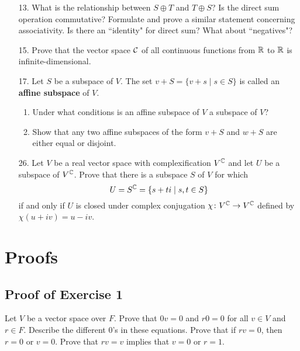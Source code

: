 \begin{enumerate}
\item[13.] What is the relationship between $S\oplus T$ and $T\oplus S$? Is the direct sum operation commutative? Formulate and prove a similar statement concerning associativity. Is there an ``identity" for direct sum? What about ``negatives"?

\item[15.] Prove that the vector space ${\mathcal{C}}$ of all continuous functions from ${\mathbb{R}}$ to ${\mathbb{R}}$ is infinite-dimensional.

\item[17.] Let $S$ be a subspace of $V$. The set $v+S=\{v+s\mid s\in S\}$ is called an \textbf{affine subspace} of $V$.
\begin{enumerate}[label=\alph*)]
	\item Under what conditions is an affine subspace of $V$ a subspace of $V$?
	\item Show that any two affine subspaces of the form $v+S$ and $w+S$ are either equal or disjoint.
\end{enumerate}

\item[26.] Let $V$ be a real vector space with complexification $V^{\mathbb{C}}$ and let $U$ be a subspace of $V^{\mathbb{C}}$. Prove that there is a subspace $S$ of $V$ for which
\[U=S^{\mathbb{C}}=\{s+ti\mid s,t\in S\}\]
if and only if $U$ is closed under complex conjugation $\chi\colon V^{\mathbb{C}}\rightarrow V^{\mathbb{C}}$ defined by $\chi(u+iv)=u-iv$.
\end{enumerate}

\vfill
\pagebreak

\section{Proofs}
\subsection{Proof of Exercise 1}
Let $V$ be a vector space over $F$. Prove that $0v=0$ and $r0=0$ for all $v\in V$ and $r\in F$. Describe the different 0's in these equations. Prove that if $rv=0$, then $r=0$ or $v=0$. Prove that $rv=v$ implies that $v=0$ or $r=1$.

